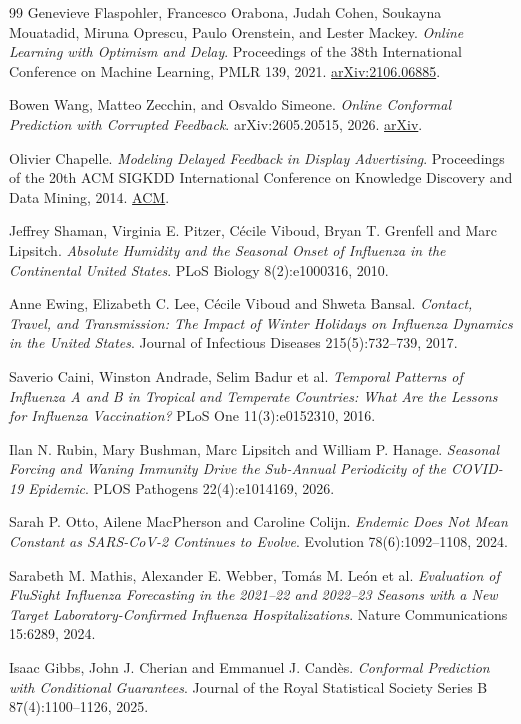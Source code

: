 \documentclass[11pt,a4paper]{article}
\theoremstyle{definition}
\theoremstyle{remark}
\begin{document}
\begin{thebibliography}{99}
Genevieve Flaspohler, Francesco Orabona, Judah Cohen, Soukayna Mouatadid,
Miruna Oprescu, Paulo Orenstein, and Lester Mackey.
\emph{Online Learning with Optimism and Delay}.
Proceedings of the 38th International Conference on Machine Learning,
PMLR 139, 2021.
\href{https://arxiv.org/abs/2106.06885}{arXiv:2106.06885}.

Bowen Wang, Matteo Zecchin, and Osvaldo Simeone.
\emph{Online Conformal Prediction with Corrupted Feedback}.
arXiv:2605.20515, 2026.
\href{https://arxiv.org/abs/2605.20515}{arXiv}.

Olivier Chapelle.
\emph{Modeling Delayed Feedback in Display Advertising}.
Proceedings of the 20th ACM SIGKDD International Conference on Knowledge
Discovery and Data Mining, 2014.
\href{https://dl.acm.org/doi/10.1145/2623330.2623634}{ACM}.

Jeffrey Shaman, Virginia E. Pitzer, C\'ecile Viboud, Bryan T. Grenfell
and Marc Lipsitch.
\emph{Absolute Humidity and the Seasonal Onset of Influenza in the
Continental United States}.
PLoS Biology 8(2):e1000316, 2010.

Anne Ewing, Elizabeth C. Lee, C\'ecile Viboud and Shweta Bansal.
\emph{Contact, Travel, and Transmission: The Impact of Winter Holidays on
Influenza Dynamics in the United States}.
Journal of Infectious Diseases 215(5):732--739, 2017.

Saverio Caini, Winston Andrade, Selim Badur et al.
\emph{Temporal Patterns of Influenza A and B in Tropical and Temperate
Countries: What Are the Lessons for Influenza Vaccination?}
PLoS One 11(3):e0152310, 2016.

Ilan N. Rubin, Mary Bushman, Marc Lipsitch and William P. Hanage.
\emph{Seasonal Forcing and Waning Immunity Drive the Sub-Annual
Periodicity of the COVID-19 Epidemic}.
PLOS Pathogens 22(4):e1014169, 2026.

Sarah P. Otto, Ailene MacPherson and Caroline Colijn.
\emph{Endemic Does Not Mean Constant as SARS-CoV-2 Continues to Evolve}.
Evolution 78(6):1092--1108, 2024.

Sarabeth M. Mathis, Alexander E. Webber, Tom\'as M. Le\'on et al.
\emph{Evaluation of FluSight Influenza Forecasting in the 2021--22 and
2022--23 Seasons with a New Target Laboratory-Confirmed Influenza
Hospitalizations}.
Nature Communications 15:6289, 2024.

Isaac Gibbs, John J. Cherian and Emmanuel J. Cand\`es.
\emph{Conformal Prediction with Conditional Guarantees}.
Journal of the Royal Statistical Society Series B 87(4):1100--1126, 2025.


\end{thebibliography}
\end{document}

